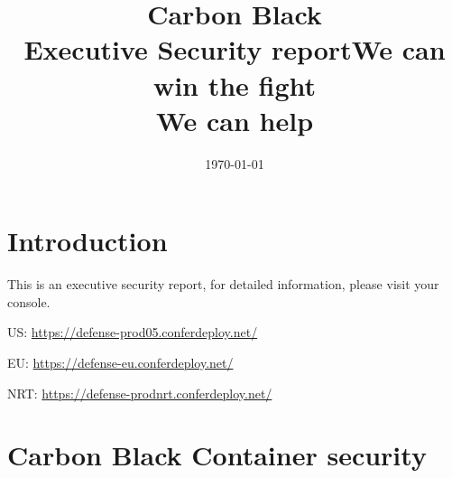 \documentclass[12pt,letterpaper]{report}
\begin{document}

\thispagestyle{empty}
\bannercbcontainer
\title{Carbon Black\\Executive Security report}

\date{\today}
\logocbcontainer

\newpage

\tableofcontents
\listoftables
\listoffigures

\chapter{Introduction}

This is an executive security report, for detailed information, please visit your console.
\vspace{1cm}

US: \href{https://defense-prod05.conferdeploy.net/}{https://defense-prod05.conferdeploy.net/}

EU: \href{https://defense-eu.conferdeploy.net/}{https://defense-eu.conferdeploy.net/}

NRT: \href{https://defense-prodnrt.conferdeploy.net/}{https://defense-prodnrt.conferdeploy.net/}


%

\chapter{Carbon Black Container security}


%

%



\newpage
\thispagestyle{empty}
\bannercbcontainer
\vspace{2cm}
\title{We can win the fight\\We can help}

\logocbcontainer
\end{document}
